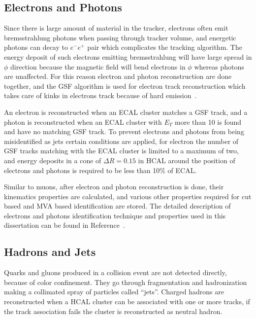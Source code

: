 \subsection{
  Electrons and Photons
}

Since there is large amount of material in the tracker, electrons often emit bremsstrahlung
photons when passing through tracker volume,
and energetic photons can decay to \( e^- e^+ \) pair which complicates the
tracking algorithm. The energy deposit of such electrons
emitting bremsstrahlung will have large spread in \( \phi \) direction because
the magnetic field will bend electrons in \( \phi \) whereas photons are unaffected.
For this reason electron and photon reconstruction are done together, and
the \gls{GSF} algorithm is used for electron track reconstruction
which takes care of kinks in electrons track because of hard emission~\cite{cms-electron-gsf}.

An electron is reconstructed when an \gls{ECAL} cluster matches a \gls{GSF} track,
and a photon is reconstructed when an \gls{ECAL} cluster with \( E_T \)
more than 10\GeV{} is found and have no matching \gls{GSF} track. To prevent
electrons and photons from being misidentified as jets certain conditions are applied,
for electron the number of \gls{GSF} tracks matching with the \gls{ECAL} cluster is limited to
a maximum of two, and energy deposits in a cone of \( \Delta R = 0.15 \) in \gls{HCAL}
around the position of electrons and photons is required to be less than 10\% of \gls{ECAL}.

Similar to muons, after electron and photon reconstruction is done, their kinematics properties
are calculated, and various other properties required for cut based
and \gls{MVA} based identification are stored. The detailed description of electrons
and photons identification technique and properties used in this dissertation
can be found in Reference~\cite{cms-egamma-id}.

\subsection{
  Hadrons and Jets
}\label{ch_reco:jets}

Quarks and gluons produced in a collision event are not detected directly,
because of color confinement. They go through fragmentation and
hadronization making a collimated spray of particles called ``jets''.
Charged hadrons are reconstructed when a \gls{HCAL} cluster can be associated with
one or more tracks, if the track association fails the cluster is reconstructed as
neutral hadron.

